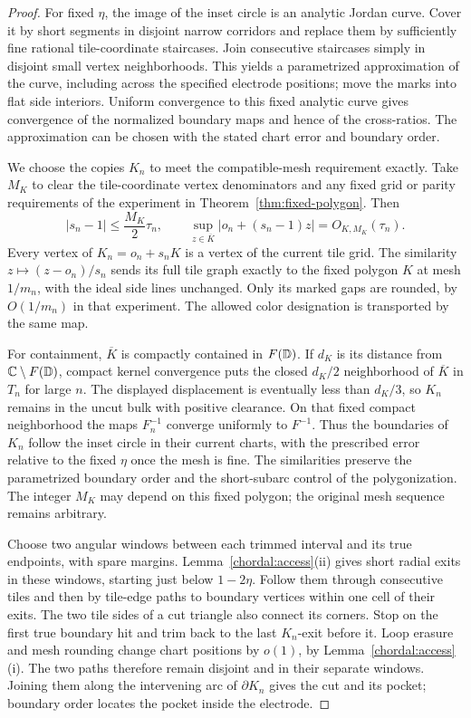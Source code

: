\begin{proof}
For fixed $\eta$, the image of the inset circle is an analytic Jordan
curve.  Cover it by short segments in disjoint narrow corridors and
replace them by sufficiently fine rational tile-coordinate
staircases.  Join consecutive staircases simply in disjoint small
vertex neighborhoods.  This yields a parametrized approximation of
the curve, including across the specified electrode positions; move
the marks into flat side interiors.  Uniform convergence to this
fixed analytic curve gives convergence of the normalized boundary
maps and hence of the cross-ratios.  The approximation can be chosen
with the stated chart error and boundary order.

We choose the copies $K_n$ to meet the compatible-mesh requirement
exactly.  Take $M_K$ to clear the tile-coordinate vertex denominators
and any fixed grid or parity requirements of the experiment in
Theorem~\ref{thm:fixed-polygon}.  Then
\[
 |s_n-1|\le \frac{M_K}{2}\tau_n,\qquad
 \sup_{z\in\overline K}|o_n+(s_n-1)z|=O_{K,M_K}(\tau_n).
\]
Every vertex of $K_n=o_n+s_nK$ is a vertex of the current tile grid.
The similarity $z\mapsto(z-o_n)/s_n$ sends its full tile graph exactly
to the fixed polygon $K$ at mesh $1/m_n$, with the ideal side lines
unchanged.  Only its marked gaps are rounded, by $O(1/m_n)$ in that
experiment.  The allowed color designation is transported by the
same map.

For containment, $\overline K$ is compactly contained in $F(\mathbb D)$.
If $d_K$ is its distance from $\mathbb C\setminus F(\mathbb D)$, compact kernel
convergence puts the closed $d_K/2$ neighborhood of $\overline K$
in $T_n$ for large $n$.  The displayed displacement is eventually
less than $d_K/3$, so $K_n$ remains in the uncut bulk with positive
clearance.  On that fixed compact neighborhood the maps
$F_n^{-1}$ converge uniformly to $F^{-1}$.  Thus the boundaries of
$K_n$ follow the inset circle in their current charts, with the
prescribed error relative to the fixed $\eta$ once the mesh is fine.
The similarities preserve the parametrized boundary order and the
short-subarc control of the polygonization.  The integer $M_K$ may
depend on this fixed polygon; the original mesh sequence remains
arbitrary.

Choose two angular windows between each trimmed interval and its
true endpoints, with spare margins.  Lemma~\ref{chordal:access}(ii)
gives short radial exits in these windows, starting just below
$1-2\eta$.  Follow them through consecutive tiles and then by
tile-edge paths to boundary vertices within one cell of their exits.
The two tile sides of a cut triangle also connect its corners.
Stop on the first true boundary hit and trim back to the last
$K_n$-exit before it.  Loop erasure and mesh rounding change chart
positions by $o(1)$, by Lemma~\ref{chordal:access}(i).  The two paths
therefore remain disjoint and in their separate windows.  Joining
them along the intervening arc of $\partial K_n$ gives the cut and
its pocket; boundary order locates the pocket inside the electrode.


\end{proof}
